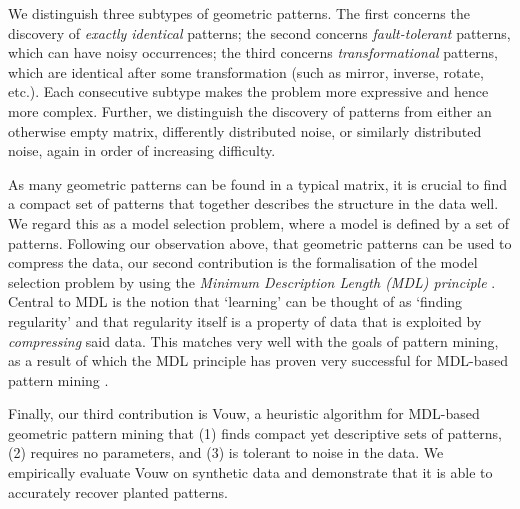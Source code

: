 \documentclass{llncs}
\begin{document}

We distinguish three subtypes of geometric patterns. The first concerns the discovery of \emph{exactly identical} patterns; the second concerns \emph{fault-tolerant} patterns, which can have noisy occurrences; the third concerns \emph{transformational} patterns, which are identical after some transformation (such as mirror, inverse, rotate, etc.). Each consecutive subtype makes the problem more expressive and hence more complex. Further, we distinguish the discovery of patterns from either an otherwise empty matrix, differently distributed noise, or similarly distributed noise, again in order of increasing difficulty.

As many geometric patterns can be found in a typical matrix, it is crucial to find a compact set of patterns that together describes the structure in the data well. We regard this as a model selection problem, where a model is defined by a set of patterns. Following our observation above, that geometric patterns can be used to compress the data, our second contribution is the formalisation of the model selection problem by using the \emph{Minimum Description Length (MDL) principle} \cite{rissanenmdl,grunwaldmdl}. Central to MDL is the notion that `learning' can be thought of as `finding regularity' and that regularity itself is a property of data that is exploited by \emph{compressing} said data. This matches very well with the goals of pattern mining, as a result of which the MDL principle has proven very successful for MDL-based pattern mining \cite{krimp,classy}.

Finally, our third contribution is Vouw, a heuristic algorithm for MDL-based geometric pattern mining that (1) finds compact yet descriptive sets of patterns, (2) requires no parameters, and (3) is tolerant to noise in the data. We empirically evaluate Vouw on synthetic data and demonstrate that it is able to accurately recover planted patterns.
\end{document}
